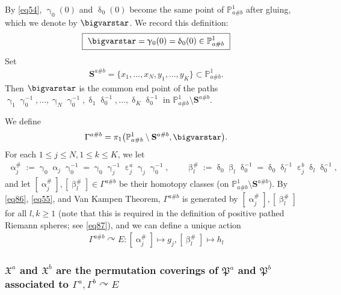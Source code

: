 \documentclass[12pt,a4paper,notitlepage]{article}
\theoremstyle{definition}
\theoremstyle{plain}
\newcommand{\fk}{\mathfrak}
\newcommand{\Pbb}{\mathbb P}
\newcommand{\Sbf}{\mathbf{S}}
\numberwithin{equation}{subsection}
\begin{document}
By \eqref{eq54}, $\upgamma_0(0)$ and $\updelta_0(0)$ become the same point of $\Pbb^1_{a\#b}$ after gluing, which we denote by $\bigvarstar$. We record this definition:
\begin{align*}
\boxed{~\bigvarstar=\upgamma_0(0)=\updelta_0(0)\in\Pbb^1_{a\#b}~}	
\end{align*}
Set
\begin{align*}
\Sbf^{a\#b}=\{x_1,\dots,x_N,y_1,\dots,y_K\}\subset \Pbb^1_{a\#b}.	
\end{align*}
Then $\bigvarstar$ is the common end point of the paths $\upgamma_1\upgamma_0^{-1},\dots,\upgamma_N\upgamma_0^{-1},\updelta_1\updelta_0^{-1},\dots,\updelta_K\updelta_0^{-1}$ in $\Pbb^1_{a\#b}\setminus\Sbf^{a\#b}$.

We define
\begin{align*}
\Gamma^{a\#b}=\pi_1\big(\Pbb^1_{a\#b}\setminus\Sbf^{a\#b},\bigvarstar \big).	
\end{align*}
For each $1\leq j\leq N,1\leq k\leq K$, we let
\begin{gather}
\upalpha_j^\#:=\upgamma_0\upalpha_j\upgamma_0^{-1}=	\upgamma_0\upgamma_j^{-1}\upepsilon_j^a\upgamma_j\upgamma_0^{-1},\qquad\upbeta_l^\#:=\updelta_0\upbeta_l\updelta_0^{-1}=	\updelta_0\updelta_l^{-1}\upepsilon_j^b\updelta_l\updelta_0^{-1},\label{eq60}
\end{gather}
and let $[\upalpha_j^\#],[\upbeta_l^\#]\in\Gamma^{a\#b}$ be their homotopy classes (on $\Pbb^1_{a\#b}\setminus\Sbf^{a\#b}$). By \eqref{eq86}, \eqref{eq55}, and Van Kampen Theorem, $\Gamma^{a\#b}$ is generated by $[\upalpha_j^\#],[\upbeta_l^\#]$ for all $l,k\geq 1$ (note that this is required in the definition of positive pathed Riemann spheres; see \eqref{eq87}), and we can define a unique action 
\begin{align}
\boxed{~\Gamma^{a\#b}\curvearrowright E:[\upalpha_j^\#]\mapsto g_j,	[\upbeta_l^\#]\mapsto h_l~}\label{eq59}
\end{align} 


\subsubsection[$\fk X^a$ and $\fk X^b$ are the permutation coverings of $\fk P^a$ and $\fk P^b$]{$\fk X^a$ and $\fk X^b$ are the permutation coverings of $\fk P^a$ and $\fk P^b$ associated to $\Gamma^a,\Gamma^b\curvearrowright E$}
\end{document}
